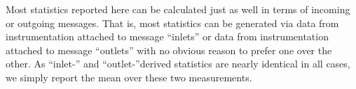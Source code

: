 Most statistics reported here can be calculated just as well in terms of incoming or outgoing messages.
That is, most statistics can be generated via data from instrumentation attached to message ``inlets'' or data from instrumentation attached to message ``outlets'' with no obvious reason to prefer one over the other.
As ``inlet-'' and ``outlet-''derived statistics are nearly identical in all cases, we simply report the mean over these two measurements.
